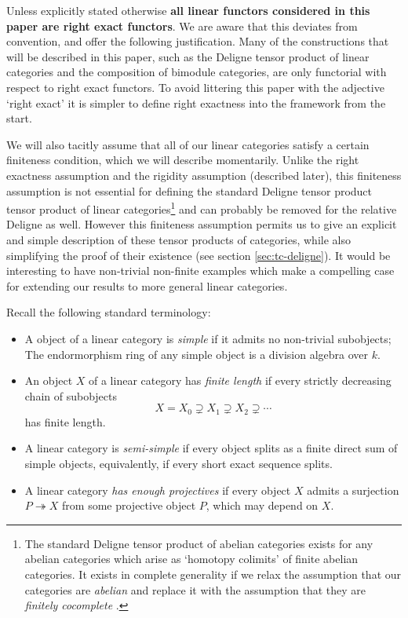 \documentclass{amsart}
\begin{document}
\begin{warning}
	Unless explicitly stated otherwise {\bfseries all linear functors considered in this paper are  right exact functors}.  We are aware that this deviates from convention, and offer the following justification. Many of the constructions that will be described in this paper, such as the Deligne tensor product of linear categories and the composition of bimodule categories, are only functorial with respect to right exact functors. To avoid littering this paper with the adjective `right exact' it is simpler to define right exactness into the framework from the start.  
\end{warning}

We will also tacitly assume that all of our linear categories satisfy a certain finiteness condition, which we will describe momentarily. Unlike the right exactness assumption and the rigidity assumption (described later), this finiteness assumption is not essential for defining the standard Deligne tensor product tensor product of linear categories\footnote{The standard Deligne tensor product of abelian categories exists for any abelian categories which arise as `homotopy colimits' of finite abelian categories. It exists in complete generality if we relax the assumption that our categories are {\em abelian} and replace it with the assumption that they are {\em finitely cocomplete} \cite{1212.1545}.} and can probably be removed for the relative Deligne as well. However this finiteness assumption permits us to give an explicit and simple 
description of these tensor products of categories, while also simplifying the proof of their existence (see section \ref{sec:tc-deligne}). It would be interesting to have non-trivial non-finite examples which make a compelling case for extending our results to more general linear categories.  

Recall the following standard terminology:
\begin{itemize}
	\item A object of a linear category is {\em simple} if it admits no non-trivial subobjects; The endormorphism ring of any simple object is a division algebra over $k$. 
	\item An object $X$ of a linear category has {\em finite length} if every strictly decreasing chain of subobjects
	\begin{equation*}
		X = X_0 \supsetneq X_1 \supsetneq X_2 \supsetneq  \cdots 
	\end{equation*}
	has finite length. 
	\item A linear category is {\em semi-simple} if every object splits as a finite direct sum of simple objects, equivalently, if every short exact sequence splits. 
	\item A linear category {\em has enough projectives} if every object $X$ admits a surjection $P \twoheadrightarrow X$ from some projective object $P$, which may depend on $X$. 
\end{itemize}
\end{document}
